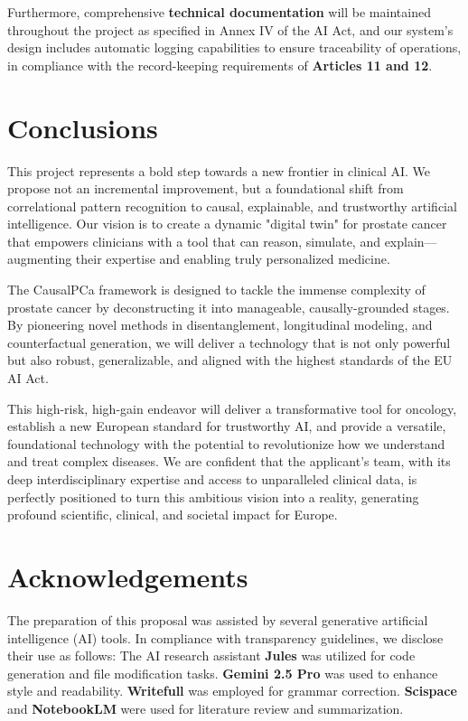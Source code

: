\documentclass[11pt, a4paper]{article}
\begin{document}
Furthermore, comprehensive \textbf{technical documentation} will be maintained throughout the project as specified in Annex IV of the AI Act, and our system's design includes automatic logging capabilities to ensure traceability of operations, in compliance with the record-keeping requirements of \textbf{Articles 11 and 12}.

\section{Conclusions}
This project represents a bold step towards a new frontier in clinical AI. We propose not an incremental improvement, but a foundational shift from correlational pattern recognition to causal, explainable, and trustworthy artificial intelligence. Our vision is to create a dynamic "digital twin" for prostate cancer that empowers clinicians with a tool that can reason, simulate, and explain—augmenting their expertise and enabling truly personalized medicine.

The CausalPCa framework is designed to tackle the immense complexity of prostate cancer by deconstructing it into manageable, causally-grounded stages. By pioneering novel methods in disentanglement, longitudinal modeling, and counterfactual generation, we will deliver a technology that is not only powerful but also robust, generalizable, and aligned with the highest standards of the EU AI Act.

This high-risk, high-gain endeavor will deliver a transformative tool for oncology, establish a new European standard for trustworthy AI, and provide a versatile, foundational technology with the potential to revolutionize how we understand and treat complex diseases. We are confident that the applicant's team, with its deep interdisciplinary expertise and access to unparalleled clinical data, is perfectly positioned to turn this ambitious vision into a reality, generating profound scientific, clinical, and societal impact for Europe.

\section*{Acknowledgements}
The preparation of this proposal was assisted by several generative artificial intelligence (AI) tools. In compliance with transparency guidelines, we disclose their use as follows: The AI research assistant \textbf{Jules} was utilized for code generation and file modification tasks. \textbf{Gemini 2.5 Pro} was used to enhance style and readability. \textbf{Writefull} was employed for grammar correction. \textbf{Scispace} and \textbf{NotebookLM} were used for literature review and summarization.
\end{document}
